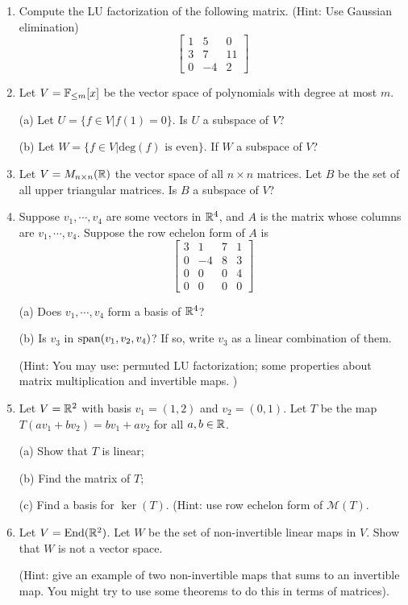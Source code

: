 \documentclass{amsart}
\theoremstyle{definition}
\begin{document}
\begin{enumerate}
\item Compute the LU factorization of the following matrix. (Hint: Use Gaussian elimination)
\[\begin{bmatrix}
	1&5&0\\3&7&11\\0&-4&2
\end{bmatrix}\]
\item Let $V=\mathbb{F}_{\leq m}[x]$ be the vector space of polynomials with degree at most $m$. 

(a) Let $U=\{f\in V|f(1)=0\}$. Is $U$ a subspace of $V$?

(b) Let $W=\{f\in V| \text{deg}(f)\text{ is even}\}$. If $W$ a subspace of $V$?
\item Let $V=M_{n\times n}(\mathbb{R})$ the vector space of all $n\times n$ matrices. Let $B$ be the set of all upper triangular matrices. Is $B$ a subspace of $V$?
\item Suppose $v_1,\cdots,v_4$ are some vectors in $\mathbb{R}^4$, and $A$ is the matrix whose columns are $v_1,\cdots,v_4$. Suppose the row echelon form of $A$ is
\[\begin{bmatrix}
	3&1&7&1\\0&-4&8&3\\0&0&0&4\\0&0&0&0
\end{bmatrix}\]

(a) Does $v_1,\cdots,v_4$ form a basis of $\mathbb{R}^4$?

(b) Is $v_3$ in $\operatorname{span}(v_1,v_2,v_4)$? If so, write $v_3$ as a linear combination of them.

(Hint: You may use: permuted LU factorization; some properties about matrix multiplication and invertible maps. )
\item Let $V=\mathbb{R}^2$ with basis $v_1 = (1,2)$ and $v_2= (0,1)$. Let $T$ be the map $T(a v_1 +b v_2)=bv_1 + av_2$ for all $a,b\in\mathbb{R}$.

(a) Show that $T$ is linear;

(b) Find the matrix of $T$;

(c) Find a basis for $\ker(T)$. (Hint: use row echelon form of $\mathcal{M}(T)$. 
\item Let $V=\text{End}({\mathbb{R}^2})$. Let $W$ be the set of non-invertible linear maps in $V$. Show that $W$ is not a vector space.

(Hint: give an example of two non-invertible maps that sums to an invertible map. You might try to use some theorems to do this in terms of matrices).


\end{enumerate}
\end{document}
